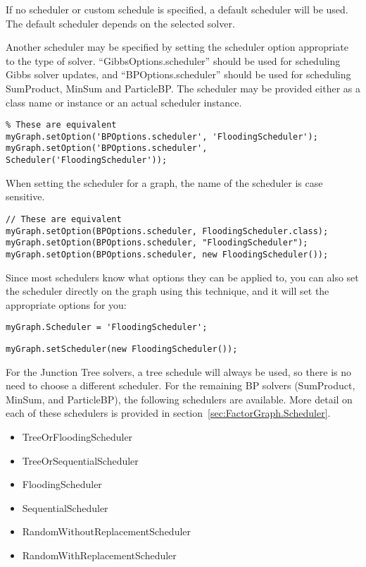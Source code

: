 If no scheduler or custom schedule is specified, a default scheduler will be used.  The default scheduler depends on the selected solver.

Another scheduler may be specified by setting the scheduler option appropriate to the type of
solver. ``GibbsOptions.scheduler'' should be used for scheduling Gibbs solver updates, and
``BPOptions.scheduler'' should be used for scheduling SumProduct, MinSum and ParticleBP. The
scheduler may be provided either as a class name or instance or an actual scheduler instance.

\ifmatlab

\begin{lstlisting}
% These are equivalent
myGraph.setOption('BPOptions.scheduler', 'FloodingScheduler');
myGraph.setOption('BPOptions.scheduler', Scheduler('FloodingScheduler'));
\end{lstlisting}

When setting the scheduler for a graph, the name of the scheduler is case sensitive.

\fi

\ifjava
\begin{lstlisting}
// These are equivalent
myGraph.setOption(BPOptions.scheduler, FloodingScheduler.class);
myGraph.setOption(BPOptions.scheduler, "FloodingScheduler");
myGraph.setOption(BPOptions.scheduler, new FloodingScheduler());
\end{lstlisting}
\fi

Since most schedulers know what options they can be applied to, you can also set the scheduler
directly on the graph using this technique, and it will set the appropriate options for you:

\ifmatlab
\begin{lstlisting}
myGraph.Scheduler = 'FloodingScheduler';
\end{lstlisting}
\fi

\ifjava
\begin{lstlisting}
myGraph.setScheduler(new FloodingScheduler());
\end{lstlisting}
\fi

For the Junction Tree solvers, a tree schedule will always be used, so there is no need to choose a different scheduler. For the remaining BP solvers (SumProduct, MinSum, and ParticleBP), the following schedulers are available.  More detail on each of these schedulers is provided in section~\ref{sec:FactorGraph.Scheduler}.

\begin{itemize}
\item TreeOrFloodingScheduler
\item TreeOrSequentialScheduler
\item FloodingScheduler
\item SequentialScheduler
\item RandomWithoutReplacementScheduler
\item RandomWithReplacementScheduler
\end{itemize}

